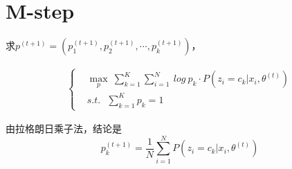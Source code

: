 \section{M-step}

求$p^{(t+1)}=(p_1^{(t+1)},p_2^{(t+1)},\cdots,p_k^{(t+1)})$，

\begin{eqnarray}
    \begin{cases}
        & \max\limits_{p}\ \sum\limits_{k=1}^{K}\sum\limits_{i=1}^{N}\ log\ p_k\cdot P(z_i=c_k|x_i,\theta^{(t)})\\
        & s.t. \ \ \ \sum\limits_{k=1}^{K}p_k=1
    \end{cases}
\end{eqnarray}

由拉格朗日乘子法，结论是
\begin{equation}
    p_k^{(t+1)}=\frac{1}{N}\sum\limits_{i=1}^{N}P(z_i=c_k|x_i,\theta^{(t)})
\end{equation}